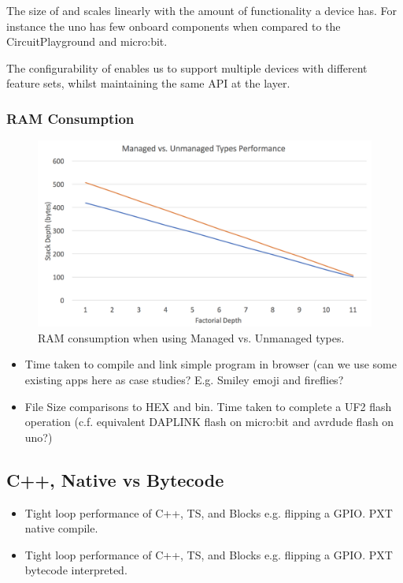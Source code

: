 The size of \CO and \MC scales linearly with the amount of functionality a device has. For instance the uno has few onboard components when compared to the CircuitPlayground and micro:bit.

The configurability of \CO enables us to support multiple devices with different feature sets, whilst maintaining the same API at the \MC layer.

\subsubsection{RAM Consumption}

\begin{figure}[ht]
    \includegraphics[width=\columnwidth]{./images/managed-vs-unmanaged.png}
\caption{\label{fig:managed-vs-unmanaged}RAM consumption when using Managed vs. Unmanaged types.}
\end{figure}


\begin{itemize}
\item Time taken to compile and link simple program in browser (can we use some existing apps
      here as case studies? E.g. Smiley emoji and fireflies?
\item \UF File Size comparisons to HEX and bin. Time taken to complete a UF2 flash operation
    (c.f. equivalent DAPLINK flash on micro:bit and avrdude flash on uno?)
\end{itemize}

\subsection{C++, Native vs Bytecode}
\begin{itemize}
\item Tight loop performance of C++, TS, and Blocks e.g. flipping a GPIO. PXT native compile.
\item Tight loop performance of C++, TS, and Blocks e.g. flipping a GPIO. PXT bytecode interpreted.
\end{itemize}

